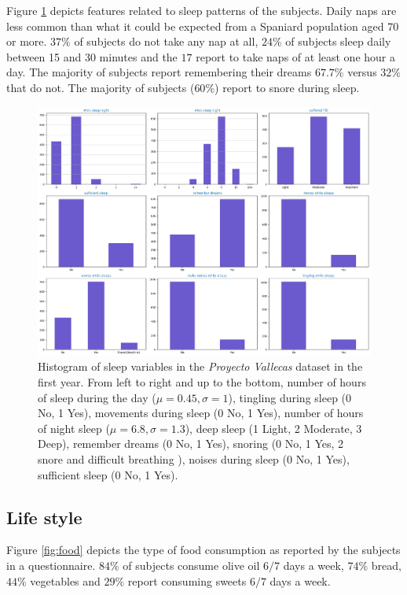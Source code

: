 \documentclass[11pt]{article}
\theoremstyle{definition}
\theoremstyle{remark}
\begin{document}
Figure \ref{fig:sleep} depicts features related to sleep patterns of the subjects. Daily naps are less common than what it could be expected from a Spaniard population aged 70 or more. $37\%$ of subjects do not take any nap at all, $24\%$ of subjects sleep daily between 15 and 30 minutes and the $17$ report to take naps of at least one hour a day. The majority of subjects report remembering their dreams $67.7\%$ versus $32\%$ that do not. The majority of subjects ($60\%$) report to snore during sleep. 
\begin{figure}[H]
        \centering
        \includegraphics[keepaspectratio, width=\linewidth]{figures/Fig_sleep}
        \caption{Histogram of sleep variables in the \emph{Proyecto Vallecas} dataset in the first year. From left to right and up to the bottom, number of hours of sleep during the day ($\mu=0.45, \sigma=1$), tingling during sleep (0 No, 1 Yes), movements during sleep (0 No, 1 Yes), number of hours of night sleep ($\mu=6.8, \sigma=1.3$), deep sleep (1 Light, 2 Moderate, 3 Deep), remember dreams (0 No, 1 Yes), snoring (0 No, 1 Yes, 2 snore and difficult breathing ), noises during sleep (0 No, 1 Yes), sufficient sleep (0 No, 1 Yes).} 
        \label{fig:sleep}
\end{figure}


\subsection{Life style}
\label{ssse:life}
Figure \ref{fig:food} depicts the type of food consumption as reported by the subjects in a questionnaire. $84\%$ of subjects consume olive oil $6/7$ days a week, $74\%$ bread, $44\%$ vegetables and $29\%$ report consuming sweets $6/7$ days a week.
\end{document}
